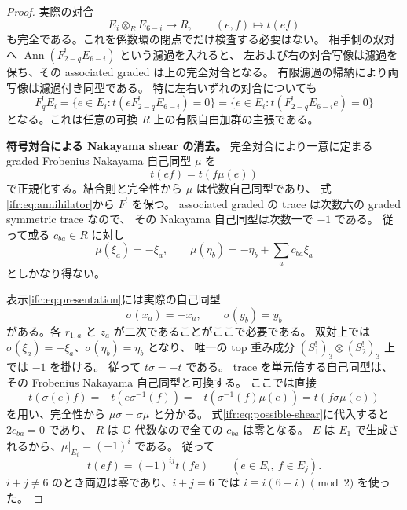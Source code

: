 \begin{proof}
実際の対合
\begin{equation}\label{ifr:eq:frobenius-pairing}
       E_i\otimes_R E_{6-i}\longrightarrow R,\qquad (e,f)\longmapsto t(ef)
\end{equation}
も完全である。これを係数環の閉点でだけ検査する必要はない。
相手側の双対へ
$\operatorname{Ann}(F^!_{2-q}E_{6-i})$ という濾過を入れると、
左および右の対合写像は濾過を保ち、その associated graded は上の完全対合となる。
有限濾過の帰納により両写像は濾過付き同型である。
特に左右いずれの対合についても
\begin{equation}\label{ifr:eq:annihilator}
 F^!_qE_i
  =\{e\in E_i:t(eF^!_{2-q}E_{6-i})=0\}
  =\{e\in E_i:t(F^!_{2-q}E_{6-i}e)=0\}
\end{equation}
となる。これは任意の可換 $R$ 上の有限自由加群の主張である。

\textbf{符号対合による Nakayama shear の消去。}
完全対合により一意に定まる graded Frobenius Nakayama 自己同型 $\mu$ を
\[
                       t(ef)=t(f\mu(e))
\]
で正規化する。結合則と完全性から $\mu$ は代数自己同型であり、
式\eqref{ifr:eq:annihilator}から $F^!$ を保つ。
associated graded の trace は次数六の graded symmetric trace なので、
その Nakayama 自己同型は次数一で $-1$ である。
従って或る $c_{ba}\in R$ に対し
\begin{equation}\label{ifr:eq:possible-shear}
 \mu(\xi_a)=-\xi_a,\qquad
 \mu(\eta_b)=-\eta_b+\sum_a c_{ba}\xi_a
\end{equation}
としかなり得ない。

表示\eqref{ifc:eq:presentation}には実際の自己同型
\[
        \sigma(x_a)=-x_a,\qquad \sigma(y_b)=y_b
\]
がある。各 $r_{1,a}$ と $z_a$ が二次であることがここで必要である。
双対上では $\sigma(\xi_a)=-\xi_a$、$\sigma(\eta_b)=\eta_b$ となり、
唯一の top 重み成分 $(S_1^!)_3\otimes(S_2^!)_3$ 上では $-1$ を掛ける。
従って $t\sigma=-t$ である。
trace を単元倍する自己同型は、その Frobenius Nakayama 自己同型と可換する。
ここでは直接
\[
 t(\sigma(e)f)
    =-t(e\sigma^{-1}(f))
    =-t(\sigma^{-1}(f)\mu(e))
    =t(f\sigma\mu(e))
\]
を用い、完全性から $\mu\sigma=\sigma\mu$ と分かる。
式\eqref{ifr:eq:possible-shear}に代入すると $2c_{ba}=0$ であり、
$R$ は $\mathbb C$-代数なので全ての $c_{ba}$ は零となる。
$E$ は $E_1$ で生成されるから、$\mu|_{E_i}=(-1)^i$ である。
従って
\begin{equation}\label{ifr:eq:graded-symmetry}
          t(ef)=(-1)^{ij}t(fe)\qquad(e\in E_i,\ f\in E_j).
\end{equation}
$i+j\ne6$ のとき両辺は零であり、$i+j=6$ では
$i\equiv i(6-i)\pmod2$ を使った。


\end{proof}

